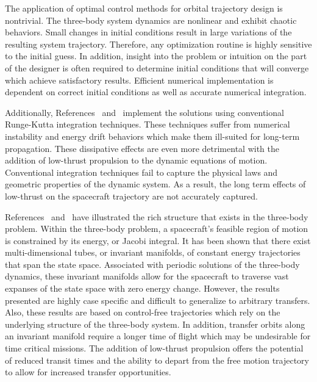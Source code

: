 \documentclass[letterpaper, paper,11pt]{AAS}		%
\begin{document}
The application of optimal control methods for orbital trajectory design is nontrivial.
The three-body system dynamics are nonlinear and exhibit chaotic behaviors. 
Small changes in initial conditions result in large variations of the resulting system trajectory. 
Therefore, any optimization routine is highly sensitive to the initial guess.
In addition, insight into the problem or intuition on the part of the designer is often required to determine initial conditions that will converge which achieve satisfactory results.
Efficient numerical implementation is dependent on correct initial conditions as well as accurate numerical integration.

Additionally, References~ and~ implement the solutions using conventional Runge-Kutta integration techniques.
These techniques suffer from numerical instability and energy drift behaviors which make them ill-suited for long-term propagation.
These dissipative effects are even more detrimental with the addition of low-thrust propulsion to the dynamic equations of motion.
Conventional integration techniques fail to capture the physical laws and geometric properties of the dynamic system.
As a result, the long term effects of low-thrust on the spacecraft trajectory are not accurately captured. 

References~ and~ have illustrated the rich structure that exists in the three-body problem.
Within the three-body problem, a spacecraft's feasible region of motion is constrained by its energy, or Jacobi integral. 
It has been shown that there exist multi-dimensional tubes, or invariant manifolds, of constant energy trajectories that span the state space. 
Associated with periodic solutions of the three-body dynamics, these invariant manifolds allow for the spacecraft to traverse vast expanses of the state space with zero energy change. 
However, the results presented are highly case specific and difficult to generalize to arbitrary transfers.
Also, these results are based on control-free trajectories which rely on the underlying structure of the three-body system.
In addition, transfer orbits along an invariant manifold require a longer time of flight which may be undesirable for time critical missions.
The addition of low-thrust propulsion offers the potential of reduced transit times and the ability to depart from the free motion trajectory to allow for increased transfer opportunities. 
\end{document}
